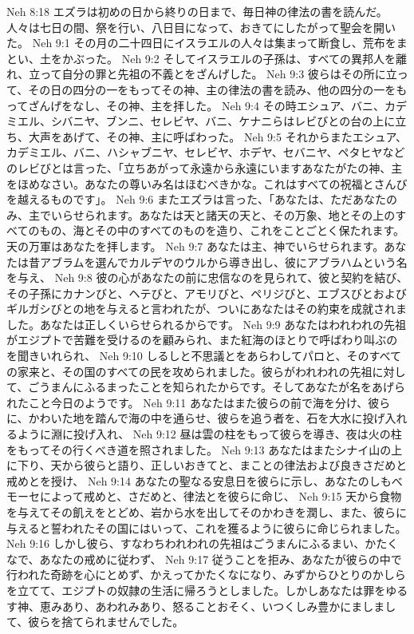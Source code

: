 Neh 8:18  エズラは初めの日から終りの日まで、毎日神の律法の書を読んだ。人々は七日の間、祭を行い、八日目になって、おきてにしたがって聖会を開いた。
Neh 9:1  その月の二十四日にイスラエルの人々は集まって断食し、荒布をまとい、土をかぶった。
Neh 9:2  そしてイスラエルの子孫は、すべての異邦人を離れ、立って自分の罪と先祖の不義とをざんげした。
Neh 9:3  彼らはその所に立って、その日の四分の一をもってその神、主の律法の書を読み、他の四分の一をもってざんげをなし、その神、主を拝した。
Neh 9:4  その時エシュア、バニ、カデミエル、シバニヤ、ブンニ、セレビヤ、バニ、ケナニらはレビびとの台の上に立ち、大声をあげて、その神、主に呼ばわった。
Neh 9:5  それからまたエシュア、カデミエル、バニ、ハシャブニヤ、セレビヤ、ホデヤ、セバニヤ、ペタヒヤなどのレビびとは言った、「立ちあがって永遠から永遠にいますあなたがたの神、主をほめなさい。あなたの尊いみ名はほむべきかな。これはすべての祝福とさんびを越えるものです」。
Neh 9:6  またエズラは言った、「あなたは、ただあなたのみ、主でいらせられます。あなたは天と諸天の天と、その万象、地とその上のすべてのもの、海とその中のすべてのものを造り、これをことごとく保たれます。天の万軍はあなたを拝します。
Neh 9:7  あなたは主、神でいらせられます。あなたは昔アブラムを選んでカルデヤのウルから導き出し、彼にアブラハムという名を与え、
Neh 9:8  彼の心があなたの前に忠信なのを見られて、彼と契約を結び、その子孫にカナンびと、ヘテびと、アモリびと、ペリジびと、エブスびとおよびギルガシびとの地を与えると言われたが、ついにあなたはその約束を成就されました。あなたは正しくいらせられるからです。
Neh 9:9  あなたはわれわれの先祖がエジプトで苦難を受けるのを顧みられ、また紅海のほとりで呼ばわり叫ぶのを聞きいれられ、
Neh 9:10  しるしと不思議とをあらわしてパロと、そのすべての家来と、その国のすべての民を攻められました。彼らがわれわれの先祖に対して、ごうまんにふるまったことを知られたからです。そしてあなたが名をあげられたこと今日のようです。
Neh 9:11  あなたはまた彼らの前で海を分け、彼らに、かわいた地を踏んで海の中を通らせ、彼らを追う者を、石を大水に投げ入れるように淵に投げ入れ、
Neh 9:12  昼は雲の柱をもって彼らを導き、夜は火の柱をもってその行くべき道を照されました。
Neh 9:13  あなたはまたシナイ山の上に下り、天から彼らと語り、正しいおきてと、まことの律法および良きさだめと戒めとを授け、
Neh 9:14  あなたの聖なる安息日を彼らに示し、あなたのしもべモーセによって戒めと、さだめと、律法とを彼らに命じ、
Neh 9:15  天から食物を与えてその飢えをとどめ、岩から水を出してそのかわきを潤し、また、彼らに与えると誓われたその国にはいって、これを獲るように彼らに命じられました。
Neh 9:16  しかし彼ら、すなわちわれわれの先祖はごうまんにふるまい、かたくなで、あなたの戒めに従わず、
Neh 9:17  従うことを拒み、あなたが彼らの中で行われた奇跡を心にとめず、かえってかたくなになり、みずからひとりのかしらを立てて、エジプトの奴隷の生活に帰ろうとしました。しかしあなたは罪をゆるす神、恵みあり、あわれみあり、怒ることおそく、いつくしみ豊かにましまして、彼らを捨てられませんでした。
